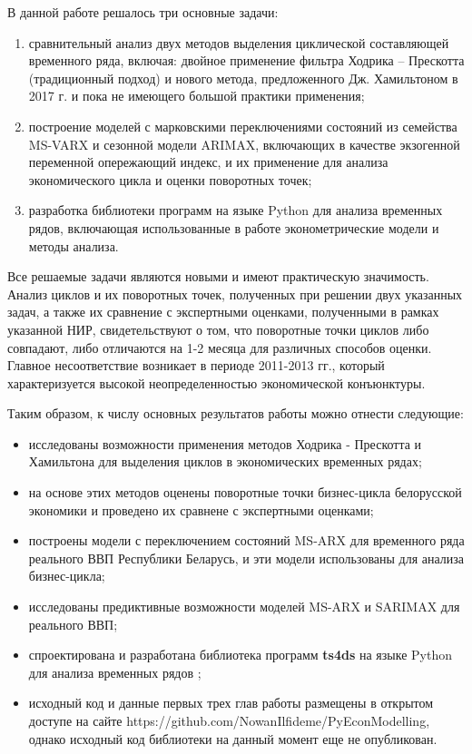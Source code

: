 \documentclass[a4paper,14pt]{extreport}
\begin{document}
{		В данной работе решалось три основные задачи:
		\begin{enumerate}
			
			\item   сравнительный анализ двух методов выделения циклической составляющей временного ряда, включая: двойное применение фильтра Ходрика – Прескотта (традиционный подход) и нового метода, предложенного Дж. Хамильтоном в 2017 г.  и пока не имеющего большой практики применения;
			\item   построение моделей с марковскими переключениями состояний из семейства MS-VARX и сезонной модели ARIMAX, включающих в качестве экзогенной переменной опережающий индекс, и их применение для анализа экономического цикла и оценки поворотных точек;
			\item   разработка библиотеки программ на языке Python для анализа временных рядов, включающая использованные в работе эконометрические модели и методы анализа.
		\end{enumerate}
		
		Все решаемые задачи являются новыми и имеют практическую значимость. Анализ циклов и их поворотных точек, полученных при решении двух указанных задач, а также их сравнение с экспертными оценками, полученными в рамках указанной НИР, свидетельствуют о том, что поворотные точки циклов либо совпадают, либо отличаются на 1-2 месяца для различных способов оценки. Главное несоответствие  возникает в периоде 2011-2013 гг., который характеризуется высокой неопределенностью экономической конъюнктуры.
		
		Таким образом, к числу основных результатов работы можно отнести следующие:
		
		\begin{itemize}
			\item исследованы возможности применения методов Ходрика - Прескотта и Хамильтона для выделения циклов в экономических временных рядах;
			\item на основе этих методов оценены поворотные точки бизнес-цикла белорусской экономики и проведено их сравнене с экспертными оценками;
			\item построены модели с переключением состояний MS-ARX для временного ряда реального ВВП Республики Беларусь, и эти модели использованы для анализа бизнес-цикла;
			\item исследованы предиктивные возможности моделей MS-ARX и SARIMAX для реального ВВП;
			\item спроектирована и разработана библиотека программ \textbf{ts4ds} на языке Python для анализа временных рядов ;
			\item исходный код и данные  первых трех глав работы размещены в открытом доступе на сайте {https://github.com/NowanIlfideme/PyEconModelling}, однако исходный код библиотеки на данный момент еще не опубликован.
		\end{itemize}
		
}
\end{document}
